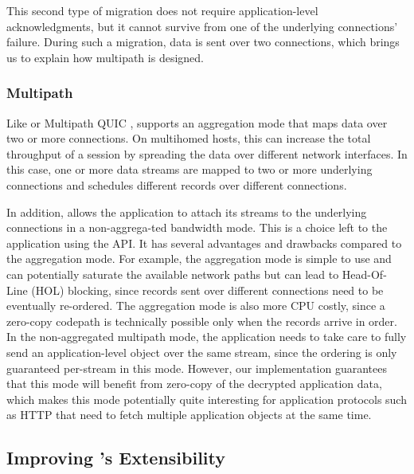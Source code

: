This second type of migration does not require application-level
acknowledgments, but it cannot survive from one of the
underlying connections' failure. During such a migration, data is sent over two
connections, which brings us to explain how multipath is designed.

\subsubsection{Multipath}

Like \mptcp \cite{raiciu2012hard,rfc6824} or Multipath QUIC
\cite{de2017multipath,draft-liu-multipath-quic-02}, \tcpls supports an
aggregation mode that maps data over two or more \tcp connections. On multihomed
hosts, this can increase the total throughput of a \tcpls session by spreading
the data over different network interfaces. In this case, one or more data
streams are mapped to two or more underlying \tcp connections and \tcpls
schedules different records over different connections.

In addition, \tcpls allows the application to attach its streams to the
underlying \tcp connections in a non-aggrega-ted bandwidth mode. This is a
choice left to the application using the API. It has several advantages and
drawbacks compared to the aggregation mode. For example, the aggregation mode is
simple to use and can potentially saturate the available network paths but can
lead to Head-Of-Line (HOL) blocking, since records sent over different \tcp
connections need to be eventually re-ordered. The aggregation mode is also more
CPU costly, since a zero-copy codepath is technically possible only when the
records arrive in order. In the non-aggregated multipath mode, the application
needs to take care to fully send an application-level object over the same
stream, since the ordering is only guaranteed per-stream in this mode. However,
our \tcpls implementation guarantees that this mode will benefit from zero-copy
of the decrypted application data, which makes this mode potentially quite
interesting for application protocols such as HTTP that need to fetch multiple
application objects at the same time.

\subsection{Improving \tcp's Extensibility}

